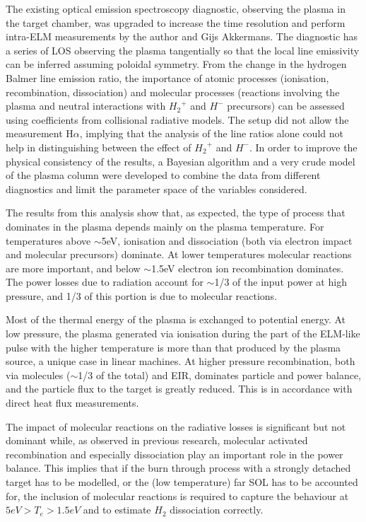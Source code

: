 The existing optical emission spectroscopy diagnostic, observing the plasma in the target chamber, was upgraded to increase the time resolution and perform intra-ELM measurements by the author and Gijs Akkermans. The diagnostic has a series of LOS observing the plasma tangentially so that the local line emissivity can be inferred assuming poloidal symmetry. From the change in the hydrogen Balmer line emission ratio, the importance of atomic processes (ionisation, recombination, dissociation) and molecular processes (reactions involving the plasma and neutral interactions with ${H_2}^+$ and $H^-$ precursors) can be assessed using coefficients from collisional radiative models. The setup did not allow the measurement H$\alpha$, implying that the analysis of the line ratios alone could not help in distinguishing between the effect of ${H_2}^+$ and $H^-$. In order to improve the physical consistency of the results, a Bayesian algorithm and a very crude model of the plasma column were developed to combine the data from different diagnostics and limit the parameter space of the variables considered.

The results from this analysis show that, as expected, the type of process that dominates in the plasma depends mainly on the plasma temperature. For temperatures above $\sim$5eV, ionisation and dissociation (both via electron impact and molecular precursors) dominate. At lower temperatures molecular reactions are more important, and below $\sim$1.5eV electron ion recombination dominates. The power losses due to radiation account for $\sim$1/3 of the input power at high pressure, and 1/3 of this portion is due to molecular reactions.

Most of the thermal energy of the plasma is exchanged to potential energy. At low pressure, the plasma generated via ionisation during the part of the ELM-like pulse with the higher temperature is more than that produced by the plasma source, a unique case in linear machines. At higher pressure recombination, both via molecules ($\sim$1/3 of the total) and EIR, dominates particle and power balance, and the particle flux to the target is greatly reduced. This is in accordance with direct heat flux measurements. 

The impact of molecular reactions on the radiative losses is significant but not dominant while, as observed in previous research, molecular activated recombination and especially dissociation play an important role in the power balance. This implies that if the burn through process with a strongly detached target has to be modelled, or the (low temperature) far SOL has to be accounted for, the inclusion of molecular reactions is required to capture the behaviour at $5eV>T_e>1.5eV$ and to estimate $H_2$ dissociation correctly.



